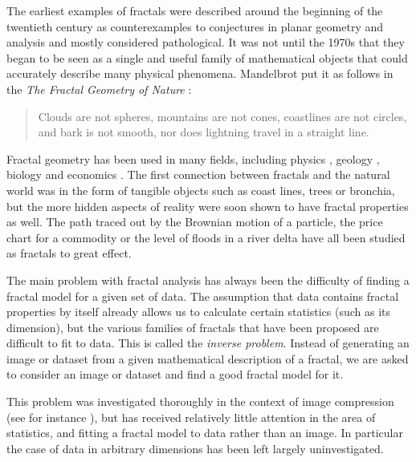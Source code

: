 \documentclass[10pt,a4paper,oneside]{article}
\theoremstyle{definition}
\begin{document}
The earliest examples of fractals were described around the beginning of the twentieth century as counterexamples to conjectures in planar geometry and analysis and mostly considered pathological. It was not until the 1970s that they began to be seen as a single and useful family of mathematical objects that could accurately describe many physical phenomena. Mandelbrot put it as follows in the \emph{The Fractal Geometry of Nature} \cite{mandelbrot1982fractal}:

\begin{quotation}
\small
\noindent Clouds are not spheres, mountains are not cones, coastlines are not circles, and bark is not smooth, nor does lightning travel in a straight line.
\end{quotation}

Fractal geometry has been used in many fields, including physics \cite{mandelbrot1984fractals}, geology \cite{cheng1997multifractal}, biology \cite{goldberger1992fractal} and economics \cite{turiel2003multifractal}. The first connection between fractals and the natural world was in the form of tangible objects such as coast lines, trees or bronchia, but the more hidden aspects of reality were soon shown to have fractal properties as well. The path traced out by the Brownian motion of a particle, the price chart for a commodity or the level of floods in a river delta have all been studied as fractals to great effect.

The main problem with fractal analysis has always been the difficulty of finding a fractal model for a given set of data. The assumption that data contains fractal properties by itself already allows us to calculate certain statistics (such as its dimension), but the various families of fractals that have been proposed are difficult to fit to data. This is called the \emph{inverse problem}. Instead of generating an image or dataset from a given mathematical description of a fractal, we are asked to consider an image or dataset and find a good fractal model for it.

This problem was investigated thoroughly in the context of image compression (see for instance \cite{hart1996fractal}), but has received relatively little attention in the area of statistics, and fitting a fractal model to data rather than an image. In particular the case of data in arbitrary dimensions has been left largely uninvestigated.

\end{document}
